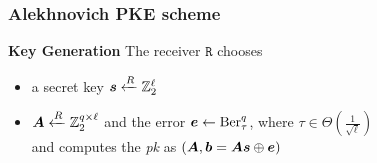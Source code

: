 \begin{frame}
\frametitle{Alekhnovich PKE scheme}
\begin{overprint} 
 \begin{center}   \end{center}
 \begin{center}   \end{center}
 \begin{center}   \end{center}
\end{overprint}

\begin{overprint} 
\begin{block}{\textbf{Key Generation}}
 The receiver $\mathtt{R}$ chooses
 \begin{itemize}
  \item<2-> a secret key $\boldsymbol{s} \xleftarrow{R} \mathbb{Z}_2^{\ell}$
  \item<3-> $\boldsymbol{A} \xleftarrow{R} \mathbb{Z}_2^{q \times \ell}$ and the error $\boldsymbol{e} \gets \mathrm{Ber}_{\tau}^{q}$, where $ \tau \in \Theta(\frac{1}{\sqrt{\ell}}) $ \\
  and computes the \emph{pk} as $\left( \boldsymbol{A},\boldsymbol{b}= \boldsymbol{A}\boldsymbol{s} \mathbin{\oplus} \boldsymbol{e} \right)$
 \end{itemize}
\end{block}
\end{overprint}

\end{frame}

